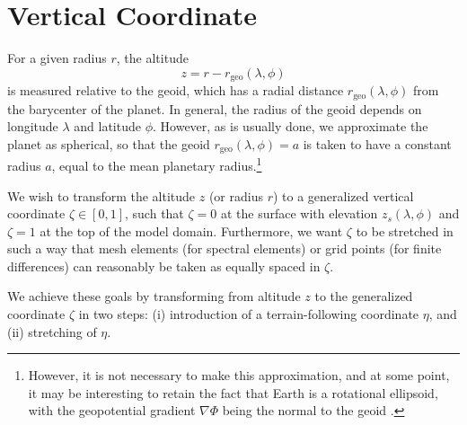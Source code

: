 \documentclass{report}
\begin{document}
% 

\section{Vertical Coordinate}

For a given radius $r$, the altitude 
\begin{equation}
    z = r - r_\mathrm{geo}(\lambda,\phi)
\end{equation}
is measured relative to the geoid, which has a radial distance $r_\mathrm{geo}(\lambda,\phi)$ from the barycenter of the planet. In general, the radius of the geoid depends on longitude $\lambda$ and latitude $\phi$. However, as is usually done, we approximate the planet as spherical, so that the geoid $r_\mathrm{geo}(\lambda,\phi) = a$ is taken to have a constant radius $a$, equal to the mean planetary radius.\footnote{However, it is not necessary to make this approximation, and at some point, it may be interesting to retain the fact that Earth is a rotational ellipsoid, with the geopotential gradient $\nabla \Phi$ being the normal to the geoid \citep{Baldauf20a}.}

We wish to transform the altitude $z$ (or radius $r$) to a generalized vertical coordinate $\zeta \in [0, 1]$, such that $\zeta=0$ at the surface with elevation $z_s(\lambda, \phi)$  and $\zeta=1$ at the top of the model domain. Furthermore, we want $\zeta$ to be stretched in such a way that mesh elements (for spectral elements) or grid points (for finite differences) can reasonably be taken as equally spaced in $\zeta$. 

We achieve these goals by transforming from altitude $z$ to the generalized coordinate $\zeta$ in two steps: (i) introduction of a terrain-following coordinate $\eta$, and (ii) stretching of $\eta$.
\end{document}
